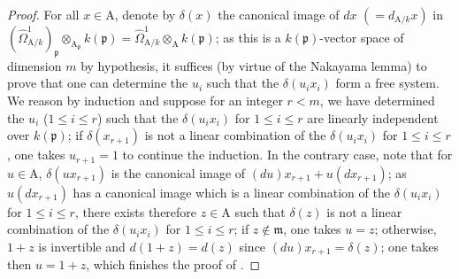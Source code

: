 \begin{proof}
For all $x\in\mathrm{A}$, denote by $\delta(x)$ the canonical image of $dx$ $(=d_{\mathrm{A}/k}x)$ in $(\hat{\Omega}^1_{\mathrm{A}/k})_\mathfrak{p}\otimes_{\mathrm{A}_\mathfrak{p}}k(\mathfrak{p})=\hat{\Omega}^1_{\mathrm{A}/k}\otimes_{\mathrm{A}}k(\mathfrak{p})$; as this is a $k(\mathfrak{p})$-vector space of dimension $m$ by hypothesis, it suffices (by virtue of the Nakayama lemma) to prove that one can determine the $u_i$ such that the $\delta(u_ix_i)$ form a free system.
We reason by induction and suppose for an integer $r<m$, we have determined the $u_i$ ($1\leq i\leq r$) such that the $\delta(u_ix_i)$ for $1\leq i\leq r$ are linearly independent over $k(\mathfrak{p})$; if $\delta(x_{r+1})$ is not a linear combination of the $\delta(u_ix_i)$ for $1\leq i\leq r$, one takes $u_{r+1}=1$ to continue the induction.
In the contrary case, note that for $u\in\mathrm{A}$, $\delta(ux_{r+1})$ is the canonical image of $(du)x_{r+1}+u(dx_{r+1})$; as $u(dx_{r+1})$ has a canonical image which is a linear combination
of the $\delta(u_ix_i)$ for $1\leq i\leq r$, there exists therefore $z\in\mathrm{A}$ such that $\delta(z)$ is not a linear combination of the $\delta(u_ix_i)$ for $1\leq i\leq r$; if $z\notin\mathfrak{m}$, one takes $u=z$; otherwise, $1+z$ is invertible and $d(1+z)=d(z)$ since $(du)x_{r+1}=\delta(z)$; one takes then $u=1+z$, which finishes the proof of .
\end{proof}

